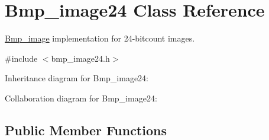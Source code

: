 \hypertarget{classBmp__image24}{}\section{Bmp\+\_\+image24 Class Reference}
\label{classBmp__image24}


\hyperlink{classBmp__image}{Bmp\+\_\+image} implementation for 24-\/bitcount images.  




{\ttfamily \#include $<$bmp\+\_\+image24.\+h$>$}



Inheritance diagram for Bmp\+\_\+image24\+:


Collaboration diagram for Bmp\+\_\+image24\+:
\subsection*{Public Member Functions}
